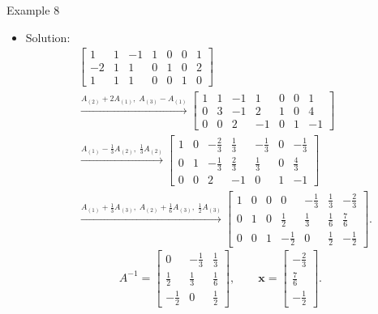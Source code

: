 \documentclass[aspectratio=169,hyperref,UTF8,CJK]{beamer}
\newcommand{\vect}[1]{\boldsymbol{#1}}
\begin{document}
\begin{frame}{Example 8}
  \scriptsize
  \begin{itemize}
    \item Solution:
      \begin{align*}
        &\left[\begin{array}{ccc|ccc|c}1&1&-1&1&0&0&1\\-2&1&1&0&1&0&2\\1&1&1&0&0&1&0\end{array}\right]\\
        &\xrightarrow{A_{(2)}+2A_{(1)},\;A_{(3)}-A_{(1)}}
        \left[\begin{array}{ccc|ccc|c}1&1&-1&1&0&0&1\\0&3&-1&2&1&0&4\\0&0&2&-1&0&1&-1\end{array}\right]\\
        &\xrightarrow{A_{(1)}-\frac13A_{(2)},\;\frac13A_{(2)}}
        \left[\begin{array}{ccc|ccc|c}1&0&-\frac23&\frac13&-\frac13&0&-\frac13\\0&1&-\frac13&\frac23&\frac13&0&\frac43\\0&0&2&-1&0&1&-1\end{array}\right]\\
        &\xrightarrow{A_{(1)}+\frac13A_{(3)},\;A_{(2)}+\frac16A_{(3)},\;\frac12A_{(3)}}
        \left[\begin{array}{ccc|ccc|c}1&0&0&0&-\frac13&\frac13&-\frac23\\0&1&0&\frac12&\frac13&\frac16&\frac76\\0&0&1&-\frac12&0&\frac12&-\frac12\end{array}\right].
      \end{align*}
      \begin{equation*}
        A^{-1}=\begin{bmatrix}0&-\frac13&\frac13\\\frac12&\frac13&\frac16\\-\frac12&0&\frac12\end{bmatrix},
        \qquad
        \vect{x}=\begin{bmatrix}-\frac23\\\frac76\\-\frac12\end{bmatrix}.
      \end{equation*}
  \end{itemize}
\end{frame}
\end{document}
